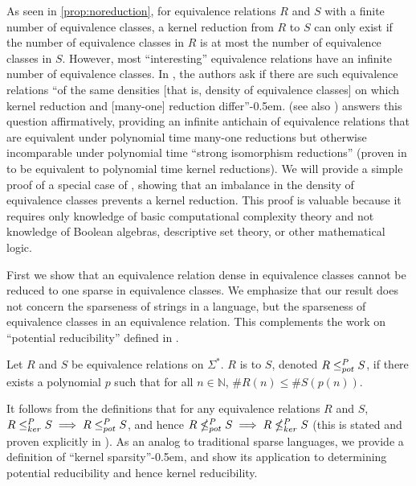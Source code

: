 As seen in \autoref{prop:noreduction}, for equivalence relations $R$ and $S$ with a finite number of equivalence classes, a kernel reduction from $R$ to $S$ can only exist if the number of equivalence classes in $R$ is at most the number of equivalence classes in $S$.
However, most ``interesting'' equivalence relations have an infinite number of equivalence classes.
In \autocite[Section~4]{fg11}, the authors ask if there are such equivalence relations ``of the same densities [that is, density of equivalence classes] on which kernel reduction and [many-one] reduction differ''\kern-0.5em.
\autocite[Theorem~5.1]{bcffm} (see also \autocite[Remark~5.2]{bcffm}) answers this question affirmatively, providing an infinite antichain of equivalence relations that are equivalent under polynomial time many-one reductions but otherwise incomparable under polynomial time ``strong isomorphism reductions'' (proven in \autocite[Section~7]{bcffm} to be equivalent to polynomial time kernel reductions).
We will provide a simple proof of a special case of \autocite[Theorem~5.1]{bcffm}, showing that an imbalance in the density of equivalence classes prevents a kernel reduction.
This proof is valuable because it requires only knowledge of basic computational complexity theory and not knowledge of Boolean algebras, descriptive set theory, or other mathematical logic.

First we show that an equivalence relation dense in equivalence classes cannot be reduced to one sparse in equivalence classes.
We emphasize that our result does not concern the sparseness of strings in a language, but the sparseness of equivalence classes in an equivalence relation.
This complements the work on ``potential reducibility'' defined in \autocite[Section~5]{bcffm}.

\begin{definition}
  Let $R$ and $S$ be equivalence relations on $\Sigma^*$.
  $R$ is  to $S$, denoted $R\leq^{P}_{pot} S$, if there exists a polynomial $p$ such that for all $n\in\mathbb{N}$, $\#R(n)\leq \#S(p(n))$.
\end{definition}

It follows from the definitions that for any equivalence relations $R$ and $S$, $R\leq^{P}_{ker} S\implies R\leq^{P}_{pot} S$, and hence $R\nleq^{P}_{pot} S \implies R\nleq^{P}_{ker} S$ (this is stated and proven explicitly in \autocite[Lemma~5.5]{bcffm}).
As an analog to traditional sparse languages, we provide a definition of ``kernel sparsity''\kern-0.5em, and show its application to determining potential reducibility and hence kernel reducibility.

